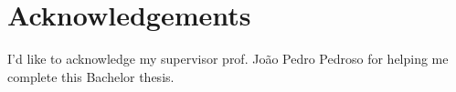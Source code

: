 \chapter*{Acknowledgements}

I'd like to acknowledge my supervisor prof. João Pedro Pedroso for helping me complete this Bachelor thesis.

